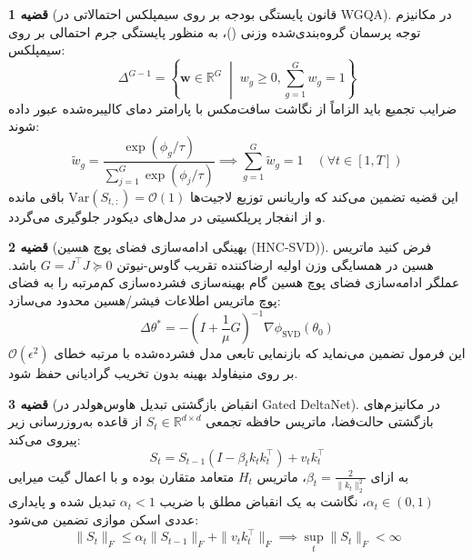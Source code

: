 \documentclass[12pt,a4paper]{report}
\theoremstyle{definition}
\newtheorem{theorem}{قضیه}[chapter]
\begin{document}
\begin{theorem}[قانون پایستگی بودجه بر روی سیمپلکس احتمالاتی در WGQA]
\label{thm:simplex_conservation_summary}
در مکانیزم توجه پرسمان گروه‌بندی‌شده وزنی ()، به منظور پایستگی جرم احتمالی بر روی سیمپلکس:
\begin{equation}
\Delta^{G-1} = \left\{ \mathbf{w} \in \mathbb{R}^G \;\middle|\; w_g \ge 0, \sum_{g=1}^G w_g = 1 \right\}
\end{equation}
ضرایب تجمیع باید الزاماً از نگاشت سافت‌مکس با پارامتر دمای کالیبره‌شده عبور داده شوند:
\begin{equation}
\tilde{w}_g = \frac{\exp(\phi_g / \tau)}{\sum_{j=1}^G \exp(\phi_j / \tau)} \implies \sum_{g=1}^G \tilde{w}_g = 1 \quad (\forall t \in [1, T])
\end{equation}
این قضیه تضمین می‌کند که واریانس توزیع لاجیت‌ها $\text{Var}(S_{t, :}) = \mathcal{O}(1)$ باقی مانده و از انفجار پرپلکسیتی در مدل‌های دیکودر جلوگیری می‌گردد.
\end{theorem}

\begin{theorem}[بهینگی ادامه‌سازی فضای پوچ هسین (HNC-SVD)]
\label{thm:hnc_optimality_summary}
فرض کنید ماتریس هسین در همسایگی وزن اولیه ارضاکننده تقریب گاوس-نیوتن $G = J^\top J \succeq 0$ باشد. عملگر ادامه‌سازی فضای پوچ هسین گام بهینه‌سازی فشرده‌سازی کم‌مرتبه را به فضای پوچ ماتریس اطلاعات فیشر/هسین محدود می‌سازد:
\begin{equation}
\Delta \theta^* = -\left( I + \frac{1}{\mu} G \right)^{-1} \nabla \phi_{\text{SVD}}(\theta_0)
\end{equation}
این فرمول تضمین می‌نماید که بازنمایی تابعی مدل فشرده‌شده با مرتبه خطای $\mathcal{O}(\epsilon^2)$ بر روی منیفاولد بهینه بدون تخریب گرادیانی حفظ شود.
\end{theorem}

\begin{theorem}[انقباض بازگشتی تبدیل هاوس‌هولدر در Gated DeltaNet]
\label{thm:deltanet_contraction_summary}
در مکانیزم‌های بازگشتی حالت‌فضا، ماتریس حافظه تجمعی $S_t \in \mathbb{R}^{d \times d}$ از قاعده به‌روزرسانی زیر پیروی می‌کند:
\begin{equation}
S_t = S_{t-1} \left( I - \beta_t k_t k_t^\top \right) + v_t k_t^\top
\end{equation}
به ازای $\beta_t = \frac{2}{\|k_t\|_2^2}$، ماتریس $H_t$ متعامد متقارن بوده و با اعمال گیت میرایی $\alpha_t \in (0, 1)$، نگاشت به یک انقباض مطلق با ضریب $\alpha_t < 1$ تبدیل شده و پایداری عددی اسکن موازی تضمین می‌شود:
\begin{equation}
\| S_t \|_F \le \alpha_t \| S_{t-1} \|_F + \| v_t k_t^\top \|_F \implies \sup_t \|S_t\|_F < \infty
\end{equation}
\end{theorem}
\end{document}
